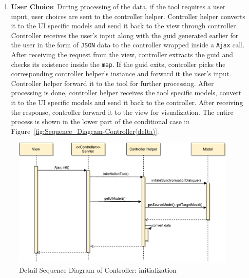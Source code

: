 \begin{enumerate}
	\item {\textbf{User Choice}: During processing of the data, if the tool requires a user input, user choices are sent to the controller helper. Controller helper converts it to the UI specific models and send it back to the view through controller. Controller receives the user's input along with the guid generated earlier for the user in the form of \texttt{JSON} data to the controller wrapped inside a \texttt{Ajax} call. After receiving the request from the view, controller extracts the guid and checks its existence inside the \texttt{map}. If the guid exits, controller picks the corresponding controller helper's instance and forward it the user's input. Controller helper forward it to the tool for further processing. After processing is done, controller helper receives the tool specific models, convert it to the UI specific models and send it back to the controller. After receiving the response, controller forward it to the view for visualization. The entire process is shown in the lower part of the conditional case in Figure~\ref{fig:Sequence_Diagram-Controller(delta)}.}
\end{enumerate}

\begin{figure}
	\includegraphics[width=1\textwidth]{figures/Sequence_Diagram-Controller(init)}
	\caption{Detail Sequence Diagram of Controller: initialization}
	\label{fig:Sequence_Diagram-Controller(init)}
\end{figure}

